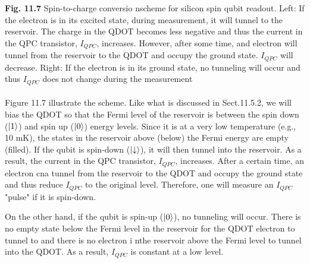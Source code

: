 \documentclass{article}
\begin{document}
\textbf{Fig. 11.7} Spin-to-charge conversio nscheme for silicon spin qubit readout. Left: If the electron is in its excited state, during measurement, 
it will tunnel to the reservoir. The charge in the QDOT becomes less negative and thus the current in the QPC transistor, $I_{QPC}$, increases.
However, after some time, and electron will tunnel from the reservoir to the QDOT and occupy the ground state. $I_{QPC}$ will decrease. Right: If the electron
is in its ground state, no tunneling will occur and thus $I_{QPC}$ does not change during the measurement
\\\\
Figure 11.7 illustrate the scheme. Like what is discussed in Sect.11.5.2, we will 
bias the QDOT so that the Fermi level of the reservoir is between the spin down ($\ket{1}$)
and spin up ($\ket{0}$) energy levels. Since it is at a very low temperature (e.g., 10 mK), the states in the
reservoir above (below) the Fermi energy are empty (filled). If the qubit is spin-down ($\ket{\downarrow}$), it will then tunnel
into the reservoir. As a result, the current in the QPC transistor, $I_{QPC}$, increases. After a certain time, an electron
cna tunnel from the reservoir to the QDOT and occupy the ground state and thus reduce $I_{QPC}$ to the original level. Therefore,
one will measure an $I_{QPC}$ "pulse" if it is spin-down.

On the other hand, if the qubit is spin-up ($\ket{0}$), no tunneling will occur. There is no empty state below the Fermi level in the
reservoir for the QDOT electron to tunnel  to and there is no electron i nthe reservoir above the Fermi level to tunnel
into the QDOT. As a result, $I_{QPC}$ is constant at a low level.
\end{document}
